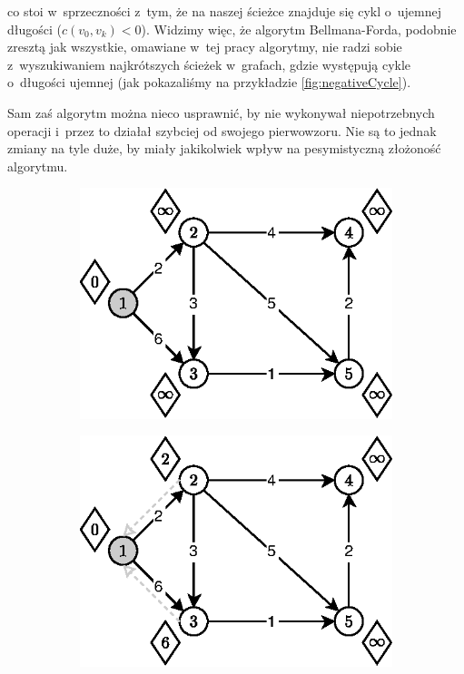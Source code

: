 co stoi w~sprzeczności z~tym, że na naszej ścieżce znajduje się cykl o~ujemnej długości ($ c \left( v_{0}, v_{k} \right) < 0 $). Widzimy więc, że algorytm Bellmana-Forda, podobnie zresztą jak wszystkie, omawiane w~tej pracy algorytmy, nie radzi sobie z~wyszukiwaniem najkrótszych ścieżek w~grafach, gdzie występują cykle o~długości ujemnej (jak pokazaliśmy na przykładzie \ref{fig:negativeCycle}).

Sam zaś algorytm można nieco usprawnić, by nie wykonywał niepotrzebnych operacji i~przez to działał szybciej od swojego pierwowzoru. Nie są to jednak zmiany na tyle duże, by miały jakikolwiek wpływ na pesymistyczną złożoność algorytmu.

\begin{figure}[!htbp]
	\centering
	\begin{subfigure}[b]{0.24\textwidth}
		\includegraphics[width=\textwidth]{Chapter_I/11/1_11a.eps}
		\caption{}
	\end{subfigure}%
	\begin{subfigure}[b]{0.24\textwidth}
		\includegraphics[width=\textwidth]{Chapter_I/11/1_11b.eps}

\end{subfigure}
\end{figure}
